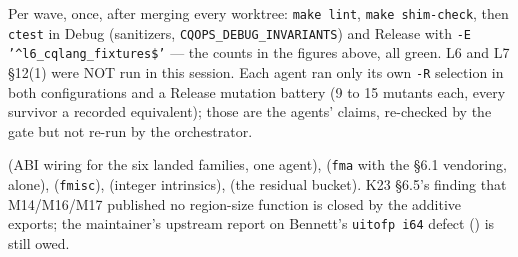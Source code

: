 Per wave, once, after merging every worktree: \texttt{make lint}, \texttt{make shim-check}, then
\texttt{ctest} in Debug (sanitizers, \texttt{CQOPS\_DEBUG\_INVARIANTS}) and Release with
\texttt{-E '\^{}l6\_cqlang\_fixtures\$'} --- the counts in the figures above, all green. L6 and L7
\S12(1) were NOT run in this session. Each agent ran only its own \texttt{-R} selection in both
configurations and a Release mutation battery (9 to 15 mutants each, every survivor a recorded
equivalent); those are the agents' claims, re-checked by the gate but not re-run by the orchestrator.

 (ABI wiring for the six landed families, one agent),  (\texttt{fma} with
the \S6.1 vendoring, alone),  (\texttt{fmisc}),  (integer intrinsics),
 (the residual bucket). K23 §6.5's finding that M14/M16/M17 published no region-size
function is closed by the additive exports; the maintainer's upstream report on Bennett's
\texttt{uitofp i64} defect () is still owed.
